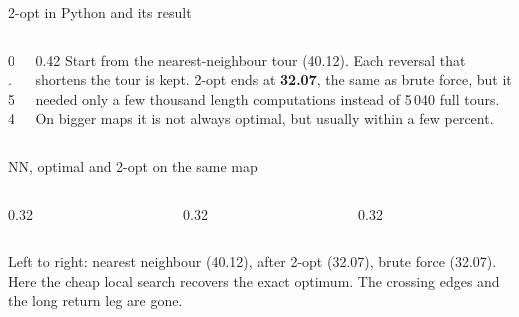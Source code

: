 \documentclass[aspectratio=169,10pt]{beamer}
\newcommand{\figtab}[2][0.5]{\begin{sfig}[#1]\end{sfig}}
\begin{document}
\begin{frame}{2-opt in Python and its result}
\begin{columns}[T]
\begin{column}{0.54\textwidth}
\pycode[\fontsize{8}{9.6}\selectfont]{two_opt}
\end{column}
\begin{column}{0.42\textwidth}
\vspace{2mm}
{\small
Start from the nearest-neighbour tour (40.12). Each reversal that shortens the tour is kept. 2-opt ends at \textbf{32.07}, the same as brute force, but it needed only a few thousand length computations instead of 5\,040 full tours. On bigger maps it is not always optimal, but usually within a few percent.}
\end{column}
\end{columns}
\end{frame}

\begin{frame}{NN, optimal and 2-opt on the same map}
\begin{columns}[T]
\begin{column}{0.32\textwidth}
\figtab[0.5]{fig_tsp_nn}
\end{column}
\begin{column}{0.32\textwidth}
\figtab[0.5]{fig_tsp_2opt}
\end{column}
\begin{column}{0.32\textwidth}
\figtab[0.5]{fig_tsp_opt}
\end{column}
\end{columns}
\vspace{1mm}
{\small Left to right: nearest neighbour (40.12), after 2-opt (32.07), brute force (32.07). Here the cheap local search recovers the exact optimum. The crossing edges and the long return leg are gone.}
\end{frame}
\end{document}
